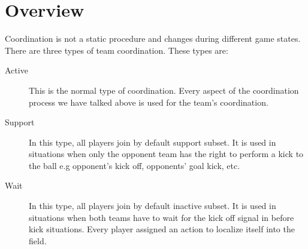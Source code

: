 \section{Overview}

Coordination is not a static procedure and changes during different game states. There are three types of team coordination. These types are:
\begin{description}
\item[Active] This is the normal type of coordination. Every aspect of the coordination process we have talked above is used for the team's coordination.
\item[Support] In this type, all players join by default support subset. It is used in situations when only the opponent team has the right to perform a kick to the ball e.g opponent's kick off,  opponents' goal kick, etc.
\item[Wait] In this type, all players join by default inactive subset. It is used in situations when both teams have to wait for the kick off signal in before kick situations. Every player assigned an action to localize itself into the field.
\end{description}




